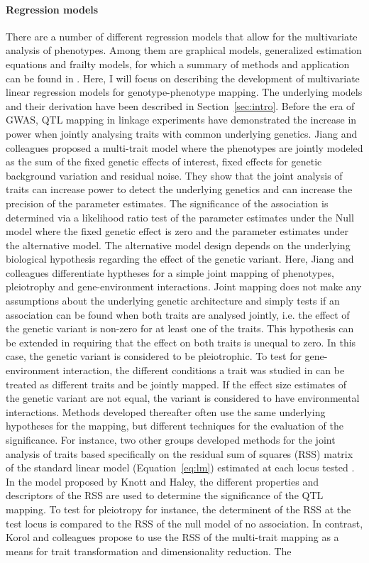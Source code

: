 \paragraph{Regression models} There are a number of different regression models that allow for the multivariate analysis of phenotypes. Among them are graphical models, generalized estimation equations and frailty models, for which a summary of methods and application can be found in \citep{Shriner2012,Yang2012}. Here, I will focus on describing the development of multivariate linear regression models for genotype-phenotype mapping. The underlying models and their derivation have been described in Section~\ref{sec:intro}. Before the era of GWAS, QTL mapping in linkage experiments have demonstrated the increase in power when jointly analysing traits with common underlying genetics. Jiang and colleagues \citeyearpar{Jiang1995} proposed a multi-trait model where the phenotypes are jointly modeled as the sum of the fixed genetic effects of interest, fixed effects for genetic background variation and residual noise. They show that the joint analysis of traits can increase power to detect the underlying genetics and can increase the precision of the parameter estimates. The significance of the association is determined via a likelihood ratio test of the parameter estimates under the Null model where the fixed genetic effect is zero and the parameter estimates under the alternative model. The alternative model design depends on the underlying biological hypothesis regarding the effect of the genetic variant. Here, Jiang and colleagues differentiate hyptheses for a simple joint mapping of phenotypes, pleiotrophy and gene-environment interactions. Joint mapping does not make any assumptions about the underlying genetic architecture and simply tests if an association can be found when both traits are analysed jointly, i.e. the effect of the genetic variant is non-zero for at least one of the traits. This hypothesis can be extended in requiring that the effect on both traits is unequal to zero. In this case, the genetic variant is considered to be pleiotrophic. To test for gene-environment interaction, the different conditions a trait was studied in can be treated as different traits and be jointly mapped. If the effect size estimates of the genetic variant are not equal, the variant is considered to have environmental interactions.  Methods developed thereafter often use the same underlying hypotheses for the mapping, but different techniques for the evaluation of the significance. For instance, two other groups developed methods for the joint analysis of traits based specifically on the residual sum of squares (RSS) matrix of the standard linear model (Equation~\ref{eq:lm}) estimated at each locus tested \citep{Knott2000,Korol2001}. In the model proposed by Knott and Haley, the different properties and descriptors of the RSS are used to determine the significance of the QTL mapping. To test for pleiotropy for instance, the determinent of the RSS at the test locus is compared to the RSS of the null model of no association. In contrast, Korol and colleagues propose to use the RSS of the multi-trait mapping as a means for trait transformation and dimensionality reduction. The 